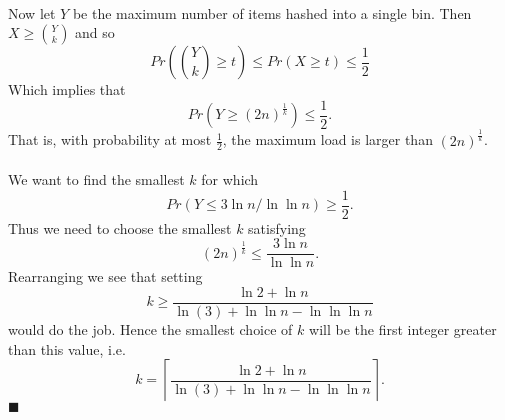 \documentclass[letterpaper,12pt,oneside,onecolumn]{article}
\newcommand{\ceil}[1]{\ensuremath{\left\lceil#1\right\rceil}}
\begin{document}
\paragraph{}
Now let $Y$ be the maximum number of items hashed into a single bin. Then $X \geq {Y \choose k}$ and so
$$Pr({Y\choose k}\geq t) \leq Pr(X \geq t) \leq \frac{1}{2}$$
Which implies that 
$$Pr(Y \geq (2n)^{\frac{1}{k}}) \leq \frac{1}{2}.$$
That is, with probability at most $\frac{1}{2}$, the maximum load is larger than $(2n)^{\frac{1}{k}}$. 
\paragraph{}
We want to find the smallest $k$ for which 
$$Pr(Y \leq 3\ln n / \ln \ln n) \geq \frac{1}{2}.$$
Thus we need to choose the smallest $k$ satisfying
$$(2n)^{\frac{1}{k}} \leq \frac{3\ln n}{\ln \ln n}.$$
Rearranging we see that setting 
$$k \geq \frac{\ln2 + \ln n}{\ln(3) + \ln\ln n - \ln\ln\ln n}$$
would do the job. Hence the smallest choice of $k$ will be the first integer greater than this value, i.e.
$$k = \ceil{\frac{\ln2 + \ln n}{\ln(3) + \ln\ln n - \ln\ln\ln n}}.$$
$\blacksquare$
\newpage
\section{}

\newpage
\section{}

\newpage
\section{}
\end{document}
